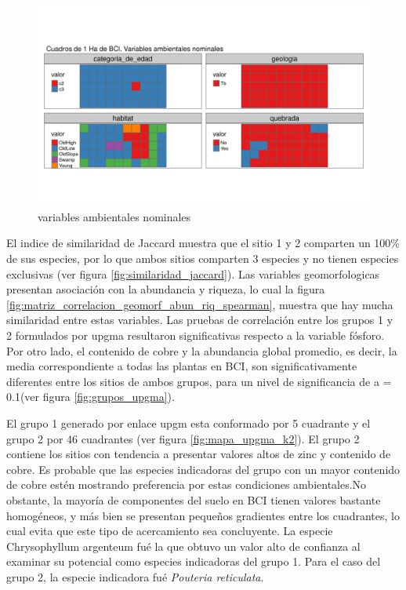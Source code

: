 \documentclass[11pt,]{article}
\begin{document}
\begin{figure}
\centering
\includegraphics{mapas_variables_ambientales_nominales_tmap.png}
\caption{variables ambientales
nominales\label{fig:mapas_variables_ambientales_nominales}}
\end{figure}

El indice de similaridad de Jaccard muestra que el sitio 1 y 2 comparten
un 100\% de sus especies, por lo que ambos sitios comparten 3 especies y
no tienen especies exclusivas (ver figura
\ref{fig:similaridad_jaccard}). Las variables geomorfologicas presentan
asociación con la abundancia y riqueza, lo cual la figura
\ref{fig:matriz_correlacion_geomorf_abun_riq_spearman}, muestra que hay
mucha similaridad entre estas variables. Las pruebas de correlación
entre los grupos 1 y 2 formulados por upgma resultaron significativas
respecto a la variable fósforo. Por otro lado, el contenido de cobre y
la abundancia global promedio, es decir, la media correspondiente a
todas las plantas en BCI, son significativamente diferentes entre los
sitios de ambos grupos, para un nivel de significancia de a = 0.1(ver
figura \ref{fig:grupos_upgma}).

El grupo 1 generado por enlace upgm esta conformado por 5 cuadrante y el
grupo 2 por 46 cuadrantes (ver figura \ref{fig:mapa_upgma_k2}). El grupo
2 contiene los sitios con tendencia a presentar valores altos de zinc y
contenido de cobre. Es probable que las especies indicadoras del grupo
con un mayor contenido de cobre estén mostrando preferencia por estas
condiciones ambientales.No obstante, la mayoría de componentes del suelo
en BCI tienen valores bastante homogéneos, y más bien se presentan
pequeños gradientes entre los cuadrantes, lo cual evita que este tipo de
acercamiento sea concluyente. La especie Chrysophyllum argenteum fué la
que obtuvo un valor alto de confianza al examinar su potencial como
especies indicadoras del grupo 1. Para el caso del grupo 2, la especie
indicadora fué \emph{Pouteria reticulata}.
\end{document}

